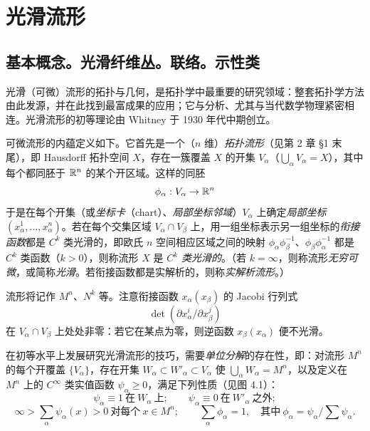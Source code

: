 \chapter{光滑流形}

\section{基本概念。光滑纤维丛。联络。示性类}


光滑（可微）流形的拓扑与几何，是拓扑学中最重要的研究领域：整套拓扑学方法由此发源，并在此找到最富成果的应用；它与分析、尤其与当代数学物理紧密相连。光滑流形的初等理论由 Whitney 于 1930 年代中期创立。

可微流形的内蕴定义如下。它首先是一个（$n$ 维）\emph{拓扑流形}（见第 2 章 §1 末尾），即 Hausdorff 拓扑空间 $X$，存在一簇覆盖 $X$ 的开集 $V_\alpha$（$\bigcup_\alpha V_\alpha=X$），其中每个都同胚于 $\mathbb{R}^n$ 的某个开区域。这样的同胚
\[
\phi_\alpha:V_\alpha\to\mathbb{R}^n
\]
于是在每个开集（或\emph{坐标卡}（chart）、\emph{局部坐标邻域}）$V_\alpha$ 上确定\emph{局部坐标} $(x_\alpha^1,\ldots,x_\alpha^n)$。若在每个交集区域 $V_\alpha\cap V_\beta$ 上，用一组坐标表示另一组坐标的\emph{衔接函数}都是 $C^k$ 类光滑的，即欧氏 $n$ 空间相应区域之间的映射 $\phi_\alpha\phi_\beta^{-1}$、$\phi_\beta\phi_\alpha^{-1}$ 都是 $C^k$ 类函数（$k>0$），则称流形 $X$ 是 \emph{$C^k$ 类光滑的}。（若 $k=\infty$，则称流形\emph{无穷可微}，或简称\emph{光滑}。若衔接函数都是实解析的，则称\emph{实解析流形}。）

流形将记作 $M^n$、$N^k$ 等。注意衔接函数 $x_\alpha(x_\beta)$ 的 Jacobi 行列式
\[
\det(\partial x_\alpha^i/\partial x_\beta^j)
\]
在 $V_\alpha\cap V_\beta$ 上处处非零：若它在某点为零，则逆函数 $x_\beta(x_\alpha)$ 便不光滑。

在初等水平上发展研究光滑流形的技巧，需要\emph{单位分解}的存在性，即：对流形 $M^n$ 的每个开覆盖 $\{V_\alpha\}$，存在开集 $W_\alpha\subset W'_\alpha\subset V_\alpha$ 使 $\bigcup_\alpha W_\alpha=M^n$，以及定义在 $M^n$ 上的 $C^\infty$ 类实值函数 $\psi_\alpha\ge0$，满足下列性质（见图 4.1）：
\[
\psi_\alpha\equiv1\ \text{在}\ W_\alpha\ \text{上};\qquad \psi_\alpha\equiv0\ \text{在}\ W'_\alpha\ \text{之外};
\]
\[
\infty>\sum_\alpha\psi_\alpha(x)>0\ \text{对每个}\ x\in M^n;\qquad \sum_\alpha\phi_\alpha=1,\quad \text{其中}\ \phi_\alpha=\psi_\alpha/\sum\psi_\alpha.
\]


